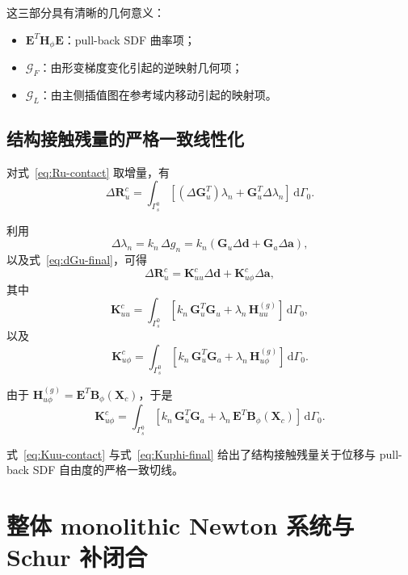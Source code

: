 \documentclass[12pt,a4paper]{ctexart}
\numberwithin{equation}{section}
\newcommand{\bE}{\bm{E}}
\newcommand{\bH}{\bm{H}}
\newcommand{\bB}{\bm{B}}
\newcommand{\bd}{\bm{d}}
\newcommand{\ba}{\bm{a}}
\newcommand{\bX}{\bm{X}}
\newcommand{\dd}{\,\mathrm{d}}
\begin{document}
这三部分具有清晰的几何意义：
\begin{itemize}
    \item $\bE^T\bH_\phi\bE$：pull-back SDF 曲率项；
    \item $\bm{\mathcal G}_F$：由形变梯度变化引起的逆映射几何项；
    \item $\bm{\mathcal G}_L$：由主侧插值图在参考域内移动引起的映射项。
\end{itemize}

\subsection{结构接触残量的严格一致线性化}

对式~\eqref{eq:Ru-contact} 取增量，有
\begin{equation}
\Delta\bm{R}_u^c
=
\int_{\Gamma_s^0}
\left[
(\Delta\bm{G}_u^T)\lambda_n + \bm{G}_u^T\Delta\lambda_n
\right]\dd\Gamma_0.
\end{equation}

利用
\begin{equation}
\Delta\lambda_n = k_n\,\Delta g_n = k_n(\bm{G}_u\Delta\bd + \bm{G}_a\Delta\ba),
\end{equation}
以及式~\eqref{eq:dGu-final}，可得
\begin{equation}
\Delta\bm{R}_u^c
=
\bm{K}_{uu}^c\Delta\bd + \bm{K}_{u\phi}^c\Delta\ba,
\end{equation}
其中
\begin{equation}
\boxed{
\bm{K}_{uu}^c
=
\int_{\Gamma_s^0}
\left[
k_n\,\bm{G}_u^T\bm{G}_u + \lambda_n\,\bm{H}_{uu}^{(g)}
\right]\dd\Gamma_0,
}
\label{eq:Kuu-contact}
\end{equation}
以及
\begin{equation}
\boxed{
\bm{K}_{u\phi}^c
=
\int_{\Gamma_s^0}
\left[
k_n\,\bm{G}_u^T\bm{G}_a + \lambda_n\,\bm{H}_{u\phi}^{(g)}
\right]\dd\Gamma_0.
}
\label{eq:Kuphi-contact}
\end{equation}

由于 $\bm{H}_{u\phi}^{(g)}=\bE^T\bB_\phi(\bX_c)$，于是
\begin{equation}
\boxed{
\bm{K}_{u\phi}^c
=
\int_{\Gamma_s^0}
\left[
k_n\,\bm{G}_u^T\bm{G}_a + \lambda_n\,\bE^T\bB_\phi(\bX_c)
\right]\dd\Gamma_0.
}
\label{eq:Kuphi-final}
\end{equation}

式~\eqref{eq:Kuu-contact} 与式~\eqref{eq:Kuphi-final} 给出了结构接触残量关于位移与 pull-back SDF 自由度的严格一致切线。

\section{整体 monolithic Newton 系统与 Schur 补闭合}\label{sec:algorithms}
\end{document}
